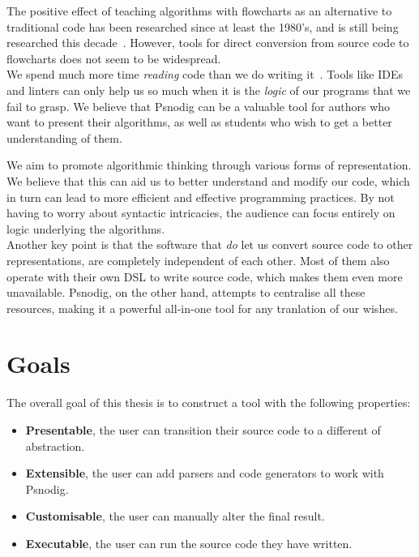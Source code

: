 The positive effect of teaching algorithms with flowcharts as an alternative to traditional code has been researched since at least the 1980's, and is still being researched this decade~\cite{flowchartsAreGood1, flowchartsAreGood2, flowchartsAreGood3}. However, tools for direct conversion from source code to flowcharts does not seem to be widespread. \\

We spend much more time \textit{reading} code than we do writing it~\cite[14]{weReadMoreThanWeCode}. Tools like IDEs and linters can only help us so much when it is the \textit{logic} of our programs that we fail to grasp. We believe that Psnodig can be a valuable tool for authors who want to present their algorithms, as well as students who wish to get a better understanding of them. \\


We aim to promote algorithmic thinking through various forms of representation. We believe that this can aid us to better understand and modify our code, which in turn can lead to more efficient and effective programming practices. By not having to worry about syntactic intricacies, the audience can focus entirely on logic underlying the algorithms. \\

Another key point is that the software that \textit{do} let us convert source code to other representations, are completely independent of each other. Most of them also operate with their own DSL to write source code, which makes them even more unavailable. Psnodig, on the other hand, attempts to centralise all these resources, making it a powerful all-in-one tool for any tranlation of our wishes. \\



\section{Goals}

The overall goal of this thesis is to construct a tool with the following properties:

\begin{itemize}
    \item \textbf{Presentable}, the user can transition their source code to a different of abstraction.
    \item \textbf{Extensible}, the user can add parsers and code generators to work with Psnodig.
    \item \textbf{Customisable}, the user can manually alter the final result.
    \item \textbf{Executable}, the user can run the source code they have written.
\end{itemize}

